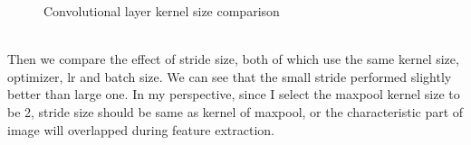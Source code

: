 \documentclass[11pt, a4paper]{article} %
\begin{document}
\begin{figure}[H]
  \centering
  \hfill
  \caption{Convolutional layer kernel size comparison}
\end{figure}
\\ Then we compare the effect of stride size, both of which use the same kernel size, optimizer, lr and batch size.
We can see that the small stride performed slightly better than large one. In my perspective, since I select the maxpool kernel size to be 2, stride size should be same as kernel of maxpool, or the characteristic part of image will overlapped during feature extraction. \newline \break
\end{document}
